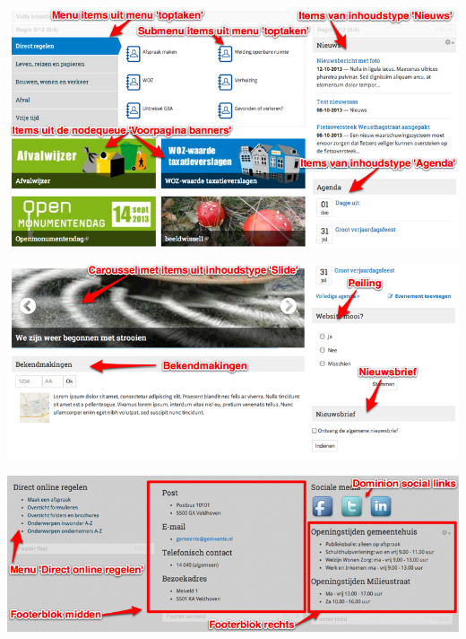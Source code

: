 \begin{center}
	\includegraphics[width=\textwidth]{img/voorpagina1.png}

	\includegraphics[width=\textwidth]{img/voorpagina2.png}

	\includegraphics[width=\textwidth]{img/voorpagina3.png}
\end{center}
